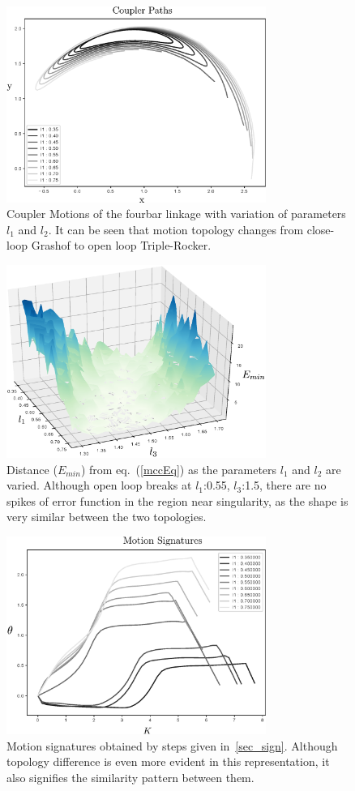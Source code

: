 \documentclass[twocolumn,10pt]{asme2e}
\newcommand{\req}[1]{(\ref{#1})}
\begin{document}
\begin{figure}
\centering
\includegraphics[width=240pt]{figure/fig_sa_coupler_curves.eps}
  \caption{Coupler Motions of the fourbar linkage with variation of parameters $l_1$ and $l_2$. It can be seen that motion topology changes from close-loop Grashof to open loop Triple-Rocker.}
\label{saCouplerCurves}
\end{figure}

\begin{figure}
\centering
\includegraphics[width=240pt]{figure/fig_sa_distance_function.eps}
  \caption{Distance ($E_{min}$) from eq.~\req{mccEq} as the parameters $l_1$ and $l_2$ are varied. Although open loop breaks at $l_1$:0.55, $l_3$:1.5, there are no spikes of error function in the region near singularity, as the shape is very similar between the two topologies.}
\label{saErrorFunction}
\end{figure}

\begin{figure}
\centering
\includegraphics[width=240pt]{figure/fig_sa_motion_signatures.eps}
  \caption{Motion signatures obtained by steps given in~\ref{sec_sign}. Although topology difference is even more evident in this representation, it also signifies the similarity pattern between them.}
\label{saMotionSignatures}
\end{figure}
\end{document}
